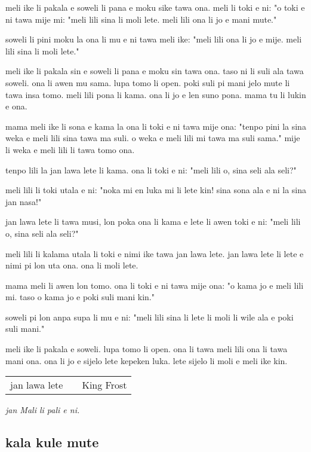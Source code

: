 meli ike li pakala e soweli li pana e moku sike tawa ona.
meli li toki e ni:
"o toki e ni tawa mije mi:
"meli lili sina li moli lete.
meli lili ona li jo e mani mute."

soweli li pini moku la ona li mu e ni tawa meli ike:
"meli lili ona li jo e mije.
meli lili sina li moli lete."

meli ike li pakala sin e soweli li pana e moku sin tawa ona.
taso ni li suli ala tawa soweli.
ona li awen mu sama.
lupa tomo li open.
poki suli pi mani jelo mute li tawa insa tomo.
meli lili pona li kama.
ona li jo e len suno pona.
mama tu li lukin e ona.

mama meli ike li sona e kama la ona li toki e ni tawa mije ona:
"tenpo pini la sina weka e meli lili sina tawa ma suli.
o weka e meli lili mi tawa ma suli sama."
mije li weka e meli lili li tawa tomo ona.

tenpo lili la jan lawa lete li kama.
ona li toki e ni:
"meli lili o, sina seli ala seli?"

meli lili li toki utala e ni:
"noka mi en luka mi li lete kin!
sina sona ala e ni la sina jan nasa!"

jan lawa lete li tawa musi, lon poka ona li kama e lete li awen toki e ni:
"meli lili o, sina seli ala seli?"

meli lili li kalama utala li toki e nimi ike tawa jan lawa lete.
jan lawa lete li lete e nimi pi lon uta ona.
ona li moli lete.

mama meli li awen lon tomo.
ona li toki e ni tawa mije ona:
"o kama jo e meli lili mi.
taso o kama jo e poki suli mani kin."

soweli pi lon anpa supa li mu e ni:
"meli lili sina li lete li moli li wile ala e poki suli mani."

meli ike li pakala e soweli.
lupa tomo li open.
ona li tawa meli lili ona li tawa mani ona.
ona li jo e sijelo lete kepeken luka.
lete sijelo li moli e meli ike kin.

\begin{supertabular}{p{5,5cm}|ll}
    jan lawa lete &  & King Frost \\
\end{supertabular}

\textit{jan Mali li pali e ni. \cite{www:astrodonunt:01}}
%
\subsection{kala kule mute}

